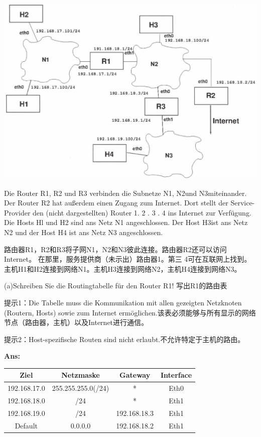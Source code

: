 \documentclass[fleqn]{article}
\begin{document}
\begin{center}
    \includegraphics[]{bild2.png}
\end{center}

Die Router R1, R2 und R3 verbinden die Subnetze N1, N2und N3miteinander. Der Router R2 hat außerdem einen Zugang zum Internet. 
Dort stellt der Service-Provider den (nicht dargestellten) Router 1. 2 . 3 . 4 ins Internet zur Verfügung.
Die Hosts Hl und H2 sind ans Netz N1 angeschlossen. Der Host H3ist ans Netz N2 und der Host H4 ist ans Netz N3 angeschlossen.

路由器R1，R2和R3将子网N1，N2和N3彼此连接。路由器R2还可以访问Internet。
在那里，服务提供商（未示出）路由器1。第三 4可在互联网上找到。
主机H1和H2连接到网络N1。主机H3连接到网络N2，主机H4连接到网络N3。

(a)Schreiben Sie die Routingtabelle für den Router R1! 写出R1的路由表

提示1：Die Tabelle muss die Kommunikation mit allen gezeigten Netzknoten (Routern, Hosts) sowie zum Internet ermöglichen.该表必须能够与所有显示的网络节点（路由器，主机）以及Internet进行通信。

提示2：Host-spezifische Routen sind nicht erlaubt.不允许特定于主机的路由。

\textbf{Ans:}
\begin{center}
\begin{tabular}{|c|c|c|c|}
    \hline
    Ziel&Netzmaske&Gateway&Interface\\
    \hline
    192.168.17.0&255.255.255.0(/24)&*&Eth0\\
    \hline
    192.168.18.0&/24&*&Eth1\\
    \hline
    192.168.19.0&/24&192.168.18.3&Eth1\\
    \hline
    Default&0.0.0.0&192.168.18.2&Eth1\\
    \hline
\end{tabular}
\end{center}
\end{document}

